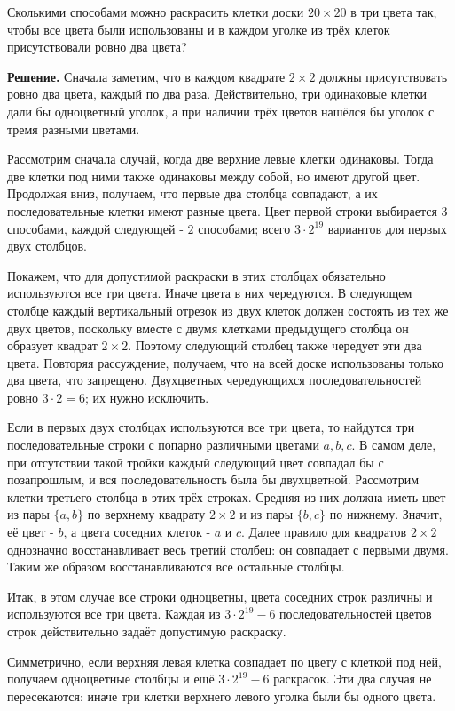 \begin{problems}
\item Сколькими способами можно раскрасить клетки доски $20\times20$ в три цвета так, чтобы все цвета были использованы и в каждом уголке из трёх клеток присутствовали ровно два цвета?
\par\smallskip\noindent\textbf{Решение.} Сначала заметим, что в каждом квадрате $2\times2$ должны присутствовать ровно два цвета, каждый по два раза. Действительно, три одинаковые клетки дали бы одноцветный уголок, а при наличии трёх цветов нашёлся бы уголок с тремя разными цветами.
\par Рассмотрим сначала случай, когда две верхние левые клетки одинаковы. Тогда две клетки под ними также одинаковы между собой, но имеют другой цвет. Продолжая вниз, получаем, что первые два столбца совпадают, а их последовательные клетки имеют разные цвета. Цвет первой строки выбирается $3$ способами, каждой следующей - $2$ способами; всего $3\cdot2^{19}$ вариантов для первых двух столбцов.
\par Покажем, что для допустимой раскраски в этих столбцах обязательно используются все три цвета. Иначе цвета в них чередуются. В следующем столбце каждый вертикальный отрезок из двух клеток должен состоять из тех же двух цветов, поскольку вместе с двумя клетками предыдущего столбца он образует квадрат $2\times2$. Поэтому следующий столбец также чередует эти два цвета. Повторяя рассуждение, получаем, что на всей доске использованы только два цвета, что запрещено. Двухцветных чередующихся последовательностей ровно $3\cdot2=6$; их нужно исключить.
\par Если в первых двух столбцах используются все три цвета, то найдутся три последовательные строки с попарно различными цветами $a,b,c$. В самом деле, при отсутствии такой тройки каждый следующий цвет совпадал бы с позапрошлым, и вся последовательность была бы двухцветной. Рассмотрим клетки третьего столбца в этих трёх строках. Средняя из них должна иметь цвет из пары $\{a,b\}$ по верхнему квадрату $2\times2$ и из пары $\{b,c\}$ по нижнему. Значит, её цвет - $b$, а цвета соседних клеток - $a$ и $c$. Далее правило для квадратов $2\times2$ однозначно восстанавливает весь третий столбец: он совпадает с первыми двумя. Таким же образом восстанавливаются все остальные столбцы.
\par Итак, в этом случае все строки одноцветны, цвета соседних строк различны и используются все три цвета. Каждая из $3\cdot2^{19}-6$ последовательностей цветов строк действительно задаёт допустимую раскраску.
\par Симметрично, если верхняя левая клетка совпадает по цвету с клеткой под ней, получаем одноцветные столбцы и ещё $3\cdot2^{19}-6$ раскрасок. Эти два случая не пересекаются: иначе три клетки верхнего левого уголка были бы одного цвета.

\end{problems}
